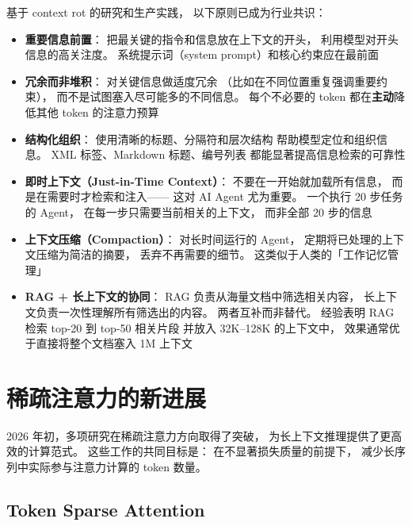 \begin{whybox}
基于 context rot 的研究和生产实践，
以下原则已成为行业共识：
\begin{itemize}[noitemsep]
  \item \textbf{重要信息前置}：
        把最关键的指令和信息放在上下文的开头，
        利用模型对开头信息的高关注度。
        系统提示词（system prompt）和核心约束应在最前面
  \item \textbf{冗余而非堆积}：
        对关键信息做适度冗余
       （比如在不同位置重复强调重要约束），
        而不是试图塞入尽可能多的不同信息。
        每个不必要的 token 都在\textbf{主动}降低其他 token 的注意力预算
  \item \textbf{结构化组织}：
        使用清晰的标题、分隔符和层次结构
        帮助模型定位和组织信息。
        XML 标签、Markdown 标题、编号列表
        都能显著提高信息检索的可靠性
  \item \textbf{即时上下文（Just-in-Time Context）}：
        不要在一开始就加载所有信息，
        而是在需要时才检索和注入——
        这对 AI Agent 尤为重要。
        一个执行 20 步任务的 Agent，
        在每一步只需要当前相关的上下文，
        而非全部 20 步的信息
  \item \textbf{上下文压缩（Compaction）}：
        对长时间运行的 Agent，
        定期将已处理的上下文压缩为简洁的摘要，
        丢弃不再需要的细节。
        这类似于人类的「工作记忆管理」
  \item \textbf{RAG + 长上下文的协同}：
        RAG 负责从海量文档中筛选相关内容，
        长上下文负责一次性理解所有筛选出的内容。
        两者互补而非替代。
        经验表明 RAG 检索 top-20 到 top-50 相关片段
        并放入 32K--128K 的上下文中，
        效果通常优于直接将整个文档塞入 1M 上下文
\end{itemize}
\end{whybox}

\section{稀疏注意力的新进展}
\label{sec:sparse-attention-2026}

2026 年初，多项研究在稀疏注意力方向取得了突破，
为长上下文推理提供了更高效的计算范式。
这些工作的共同目标是：
在不显著损失质量的前提下，
减少长序列中实际参与注意力计算的 token 数量。

\subsection{Token Sparse Attention}

